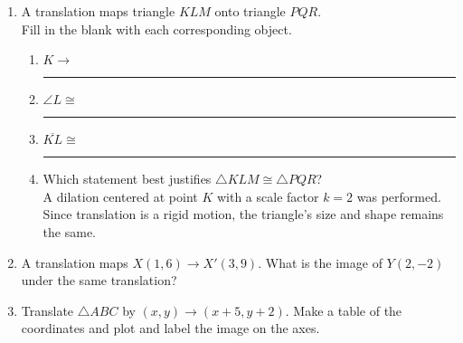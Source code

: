 \begin{enumerate}
\item A translation maps triangle $KLM$ onto triangle $PQR$. \\[0.5cm]
Fill in the blank with each corresponding object. \vspace{0.5cm}
  \begin{multicols}{2}

    \begin{enumerate}
      \item $K \rightarrow$ \rule{2cm}{0.15mm}
      \item $\angle L \cong$ \rule{2cm}{0.15mm}
      \item $\overline {KL} \cong$ \rule{2cm}{0.15mm}
      \item Which statement best justifies $\triangle KLM \cong \triangle PQR$? \\[0.5cm]
      A dilation centered at point $K$ with a scale factor $k=2$ was performed.\\[0.5cm]
      Since translation is a rigid motion, the triangle's size and shape remains the same.
    \end{enumerate}
  \end{multicols}


\item A translation maps $X(1,6) \rightarrow X'(3,9)$. What is the image of $Y(2,-2)$ under the same translation?


\item Translate $\triangle ABC$ by $(x,y) \rightarrow (x+5, y+2)$. Make a table of the coordinates and plot and label the image on the axes.
  \begin{flushright}
  \end{flushright}



\end{enumerate}
